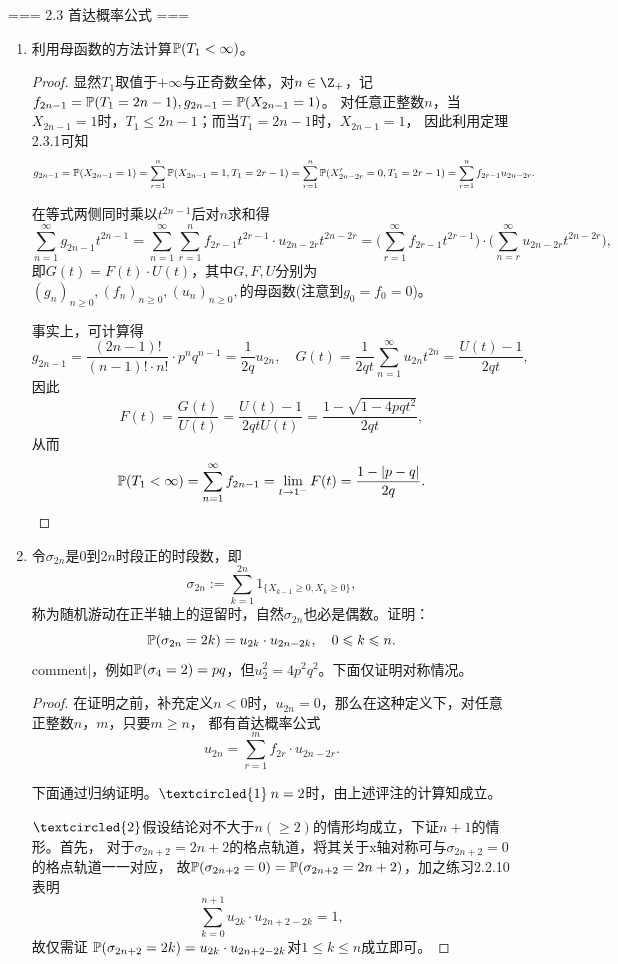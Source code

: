 === 2.3 首达概率公式 ===
\begin{enumerate}
    \item[2.3.2] 利用母函数的方法计算$\P(T_1<\infty)$。
    \begin{proof}
        显然$T_1$取值于$+\infty$与正奇数全体，对$n\in\Z_+$，记$f_{2n-1}=\P(T_1=2n-1),g_{2n-1}=\P(X_{2n-1}=1)$。
        对任意正整数$n$，当$X_{2n-1}=1$时，$T_1\leqslant2n-1$；而当$T_1=2n-1$时，$X_{2n-1}=1$，
        因此利用定理2.3.1可知\[g_{2n-1}=\P(X_{2n-1}=1)=\sum_{r=1}^n\P(X_{2n-1}=1,T_1=2r-1)=
        \sum_{r=1}^n\P(X_{2n-2r}'=0,T_1=2r-1)=\sum_{r=1}^nf_{2r-1}u_{2n-2r}.\]
        
        在等式两侧同时乘以$t^{2n-1}$后对$n$求和得\[\sum_{n=1}^\infty g_{2n-1}t^{2n-1}=
        \sum_{n=1}^\infty\sum_{r=1}^nf_{2r-1}t^{2r-1}\cdot u_{2n-2r}t^{2n-2r}=
        \bigg(\sum_{r=1}^\infty f_{2r-1}t^{2r-1}\bigg)\cdot\bigg(\sum_{n=r}^\infty u_{2n-2r}t^{2n-2r}\bigg),\]
        即$G(t)=F(t)\cdot U(t)$，其中$G,F,U$分别为
        $(g_n)_{n\geqslant0},(f_n)_{n\geqslant0},(u_n)_{n\geqslant0},$的母函数(注意到$g_0=f_0=0$)。

        事实上，可计算得\[g_{2n-1}=\frac{(2n-1)!}{(n-1)!\cdot n!}\cdot p^nq^{n-1}=\frac{1}{2q}u_{2n},\quad
        G(t)=\frac{1}{2qt}\sum_{n=1}^\infty u_{2n}t^{2n}=\frac{U(t)-1}{2qt},\]
        因此\[F(t)=\frac{G(t)}{U(t)}=\frac{U(t)-1}{2qtU(t)}=\frac{1-\sqrt{1-4pqt^2}}{2qt},\]
        从而\[\P(T_1<\infty)=\sum_{n=1}^\infty f_{2n-1}=\lim_{t\to1^-}F(t)=\frac{1-|p-q|}{2q}.\]
    \end{proof}
    \item[2.3.4] 令$\sigma_{2n}$是$0$到$2n$时段正的时段数，即\[\sigma_{2n}:=\sum_{k=1}^{2n}1_{\{X_{k-1}\geqslant0,X_k\geqslant0\}},\]
    称为随机游动在正半轴上的逗留时，自然$\sigma_{2n}$也必是偶数。证明：\[\P(\sigma_{2n}=2k)=u_{2k}\cdot u_{2n-2k},\quad0\leqslant k\leqslant n.\]
    {{comment|，例如$\P(\sigma_4=2)=pq$，但$u_2^2=4p^2q^2$。下面仅证明对称情况。}}
    \begin{proof}
        在证明之前，补充定义$n<0$时，$u_{2n}=0$，那么在这种定义下，对任意正整数$n$，$m$，只要$m\geqslant n$，
        都有首达概率公式\[u_{2n}=\sum_{r=1}^m f_{2r}\cdot u_{2n-2r}.\]

        下面通过归纳证明。$\textcircled{1}\:n=2$时，由上述评注的计算知成立。

        $\textcircled{2}$假设结论对不大于$n(\geqslant2)$的情形均成立，下证$n+1$的情形。首先，
        对于$\sigma_{2n+2}=2n+2$的格点轨道，将其关于$\text{x}$轴对称可与$\sigma_{2n+2}=0$的格点轨道一一对应，
        故$\P(\sigma_{2n+2}=0)=\P(\sigma_{2n+2}=2n+2)$，加之练习2.2.10表明
        \[\sum_{k=0}^{n+1}u_{2k}\cdot u_{2n+2-2k}=1,\]故仅需证
        $\P(\sigma_{2n+2}=2k)=u_{2k}\cdot u_{2n+2-2k}$对$1\leqslant k\leqslant n$成立即可。


\end{proof}
\end{enumerate}
